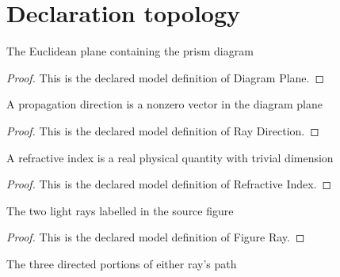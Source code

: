 \section{Declaration topology}
\begin{definition}
  \label{def:physics:phyx-mini-0099:phyxminiproblems-problemphyxmini0099-diagramplane}
  The Euclidean plane containing the prism diagram
\end{definition}
\begin{proof}
  This is the declared model definition of Diagram Plane.
\end{proof}
\begin{definition}
  \label{def:physics:phyx-mini-0099:phyxminiproblems-problemphyxmini0099-raydirection}
  A propagation direction is a nonzero vector in the diagram plane
\end{definition}
\begin{proof}
  This is the declared model definition of Ray Direction.
\end{proof}
\begin{definition}
  \label{def:physics:phyx-mini-0099:phyxminiproblems-problemphyxmini0099-refractiveindex}
  A refractive index is a real physical quantity with trivial dimension
\end{definition}
\begin{proof}
  This is the declared model definition of Refractive Index.
\end{proof}
\begin{definition}
  \label{def:physics:phyx-mini-0099:phyxminiproblems-problemphyxmini0099-figureray}
  The two light rays labelled in the source figure
\end{definition}
\begin{proof}
  This is the declared model definition of Figure Ray.
\end{proof}
\begin{definition}
  \label{def:physics:phyx-mini-0099:phyxminiproblems-problemphyxmini0099-raysegment}
  The three directed portions of either ray's path
\end{definition}
